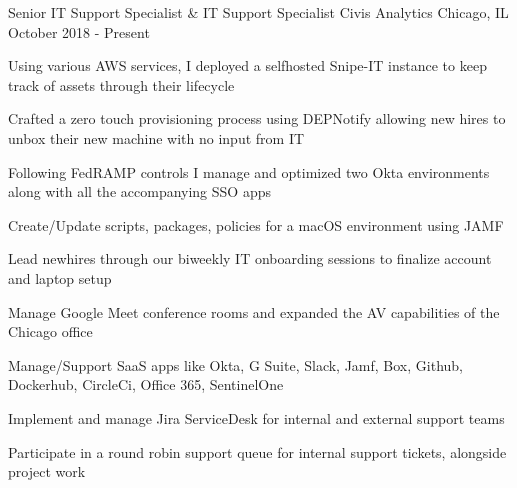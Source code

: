 

\begin{cventries}

  \cventry
  {Senior IT Support Specialist \& IT Support Specialist} %
  {Civis Analytics} %
  {Chicago, IL} %
  {October 2018 - Present} %
  {
    \begin{cvitems} %
      \item {Using various AWS services, I deployed a selfhosted Snipe-IT instance to keep track of assets through their lifecycle}
      \item {Crafted a zero touch provisioning process using DEPNotify allowing new hires to unbox their new machine with no input from IT}
      \item {Following FedRAMP controls I manage and optimized two Okta environments along with all the accompanying SSO apps}
      \item {Create/Update scripts, packages, policies for a macOS environment using JAMF}
      \item {Lead newhires through our biweekly IT onboarding sessions to finalize account and laptop setup}
      \item {Manage Google Meet conference rooms and expanded the AV capabilities of the Chicago office}
      \item {Manage/Support SaaS apps like Okta, G Suite, Slack, Jamf, Box, Github, Dockerhub, CircleCi, Office 365, SentinelOne}
      \item {Implement and manage Jira ServiceDesk for internal and external support teams}
      \item {Participate in a round robin support queue for internal support tickets, alongside project work}
    \end{cvitems}
  }


\end{cventries}
